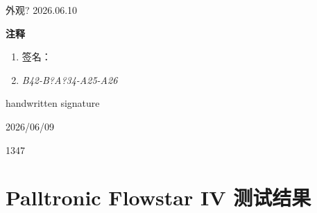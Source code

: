 \documentclass[UTF8,10pt,a4paper,fontset=fandol]{ctexart}
\newcommand{\handwritten}[1]{#1}
\begin{document}
\vspace{0.5em}

\handwritten{外观? 2026.06.10}

\vspace{1em}

\textbf{注释}

\begin{enumerate}
\item 签名：\underline{\hspace{5cm}}

\item
\textit{B42-B?A?34-A25-A26}
\end{enumerate}

\handwritten{handwritten signature}

\handwritten{2026/06/09}

\vspace{0.5em}

\handwritten{1347}

\newpage

\section*{Palltronic Flowstar IV 测试结果}
\end{document}
